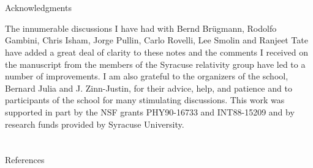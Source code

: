 \goodbreak
\vfill\break

%

\section{}{Acknowledgments}%

The innumerable discussions I have had with Bernd Br\"ugmann, Rodolfo Gambini,
Chris Isham, Jorge Pullin, Carlo Rovelli, Lee Smolin and Ranjeet Tate have
added a great deal of clarity to these notes and the comments I received on
the manuscript from the members of the Syracuse relativity group have led to
a number of improvements. I am also grateful to the organizers of the school,
Bernard Julia and  J. Zinn-Justin, for their advice, help, and patience and to
participants of the school for many stimulating discussions. This work was
supported in part by the NSF grants PHY90-16733 and INT88-15209 and by
research funds provided by Syracuse University.


\section{}{References}%

